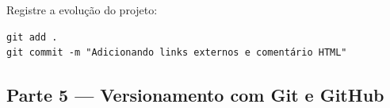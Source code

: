 \documentclass[12pt,a4paper]{article}
\begin{document}
\vspace{0.5cm}

\begin{boxAtividade}

Registre a evolução do projeto:

\begin{boxCodigo}
\begin{verbatim}
git add .
git commit -m "Adicionando links externos e comentário HTML"
\end{verbatim}
\end{boxCodigo}

\end{boxAtividade}



\newpage

\subsection{Parte 5 — Versionamento com Git e GitHub}
\end{document}
